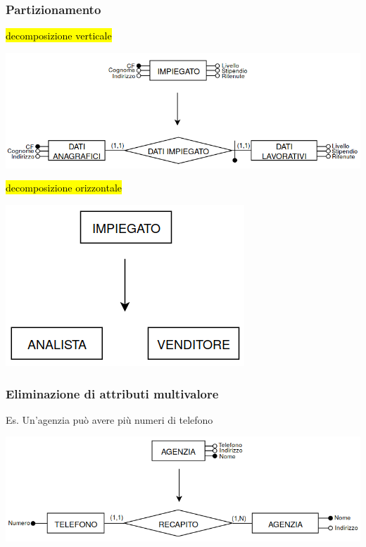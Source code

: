 \documentclass[a4paper]{article}
\begin{document}
\subsubsection{Partizionamento}
\hl{decomposizione verticale}
\begin{center}
      \includegraphics[scale=0.45]{img/pl4.png}
\end{center}
%
\hl{decomposizione orizzontale}
\begin{center}
      \includegraphics[scale=0.45]{img/pl5.png}
\end{center}

\subsubsection{Eliminazione di attributi multivalore}
Es. Un'agenzia può avere più numeri di telefono
\begin{center}
      \includegraphics[scale=0.44]{img/pl6.png}
\end{center}
\end{document}
